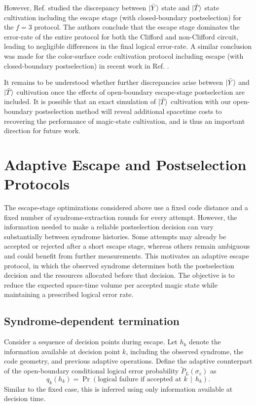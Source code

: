 \documentclass[
    reprint,
    amsmath,amssymb,
    nofootinbib,
    superscriptaddress,
    aps,
    noeprint,
    longbibliography,
    prl
]{revtex4-2}
\theoremstyle{plain}
\begin{document}
However, Ref. \cite{sahay2026fold} studied the discrepancy between $\ket{\bar Y}$ state and $\ket{\bar T}$
state cultivation including the escape stage (with closed-boundary postselection) for the $f=3$
protocol. The authors conclude that the escape stage dominates the error-rate of the entire protocol
for both the Clifford and non-Clifford circuit, leading to negligible differences in the final
logical error-rate. A similar conclusion was made for the color-surface code cultivation protocol
including escape (with closed-boundary postselection) in recent work in Ref.
\cite{chase_clifft_2026}.

It remains to be understood whether further discrepancies arise between $\ket{\bar Y}$ and $\ket{\bar T}$
cultivation once the effects of open-boundary escape-stage postselection are included. It is
possible that an exact simulation of $\ket{\bar T}$ cultivation with our open-boundary postselection
method will reveal additional spacetime costs to recovering the performance of magic-state
cultivation, and is thus an important direction for future work.

\section{Adaptive Escape and Postselection Protocols}
\label{app:adaptive-escape}

The escape-stage optimizations considered above use a fixed code distance and a fixed number of syndrome-extraction rounds for every attempt. However, the information needed to make a reliable postselection decision can vary substantially between syndrome histories. Some attempts may already be accepted or rejected after a short escape stage, whereas others remain ambiguous and could benefit from further measurements. This motivates an adaptive escape protocol, in which the observed syndrome determines both the postselection decision and the resources allocated before that decision. The objective is to reduce the expected space-time volume per accepted magic state while maintaining a prescribed logical error rate.

\subsection{Syndrome-dependent termination}

Consider a sequence of decision points during escape. Let $h_k$ denote the information available at decision point $k$, including the observed syndrome, the code geometry, and previous adaptive operations. Define the adaptive counterpart of the open-boundary conditional logical error probability $\tilde P_L(\sigma_v)$ as
\begin{equation}
    q_k(h_k)
    =
    \Pr\!\left(
        \text{logical failure if accepted at }k
        \,\middle|\, h_k
    \right).
\end{equation}
Similar to the fixed case, this is inferred using only information available at decision time.
\end{document}
